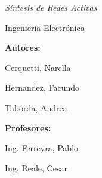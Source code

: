 \begin{titlepage}
\begin{center}
		{\itshape\Large Síntesis de Redes Activas \par}
		{\Large Ingeniería Electrónica\par}
		\vfill
		\begin{minipage}[t]{8cm}
			{\Large \textbf{Autores:} \par}
			{\Large Cerquetti, Narella \par}
			{\Large Hernandez, Facundo \par}
			{\Large Taborda, Andrea \par}
			{\Large \autor \par}
		\end{minipage}\hfill\begin{minipage}[t] {8cm}
			\begin{flushright}
				{\Large \textbf{Profesores:} \par}
				{\Large Ing. Ferreyra, Pablo\par}
				{\Large Ing. Reale, Cesar\par}
			\end{flushright}
		\end{minipage}
		\vspace{1cm}
	\end{center}
\end{titlepage}